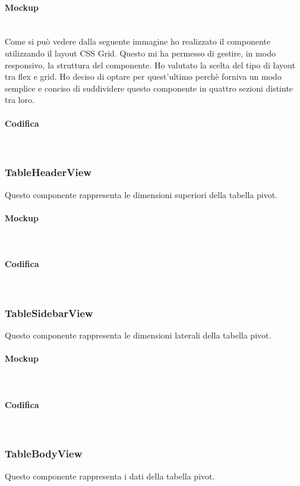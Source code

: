 \paragraph*{Mockup} \mbox{} \\
Come si può vedere dalla seguente immagine ho realizzato il componente utilizzando il layout CSS Grid. Questo mi ha permesso di gestire, in modo responsivo, la struttura del componente. Ho valutato la scelta del tipo di layout tra flex e grid. Ho deciso di optare per quest'ultimo perchè forniva un modo semplice e conciso di suddividere questo componente in quattro sezioni distinte tra loro.

\paragraph*{Codifica} \mbox{} \\



\subsubsection{TableHeaderView}
Questo componente rappresenta le dimensioni superiori della tabella pivot.
\paragraph*{Mockup} \mbox{} \\
\paragraph*{Codifica} \mbox{} \\



\subsubsection{TableSidebarView}
Questo componente rappresenta le dimensioni laterali della tabella pivot.
\paragraph*{Mockup} \mbox{} \\
\paragraph*{Codifica} \mbox{} \\


\subsubsection{TableBodyView}
Questo componente rappresenta i dati della tabella pivot.
